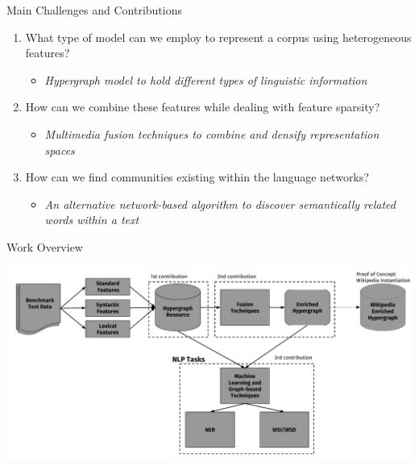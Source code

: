 \documentclass[10pt,=table]{beamer}
\begin{document}
\begin{frame}{Main Challenges and Contributions}
\vspace{1cm}
	\begin{enumerate}
		\item<1-> What type of model can we employ to represent a corpus  \textcolor{orangeEric}{using heterogeneous features}?
		\begin{itemize}
		\item<1-> \textit{Hypergraph model to  \textcolor{greenEric}{hold different types of  linguistic information}}
		\end{itemize}
		
		\item<2-> How can we combine these features while  \textcolor{orangeEric}{dealing with feature sparsity}?
		\begin{itemize}
		\item<2-> \textit{Multimedia fusion techniques to \textcolor{greenEric}{combine and densify} representation spaces}	    	 
		\end{itemize}
		\item<3-> How can we \textcolor{orangeEric}{find communities} existing within the language networks?
		\begin{itemize}
		\item<3-> \textit{An alternative network-based algorithm to \textcolor{greenEric}{discover semantically related words} within a text}
		\end{itemize}
		
	\end{enumerate}
 \vspace{\textheight}
\end{frame}


\begin{frame}{Work Overview}
\begin{center}
\vfill
\includegraphics[width=1.04\linewidth]{image2/Chapitre1/main_diag_presi.pdf}
\end{center}
\vfill
\end{frame}
\end{document}
